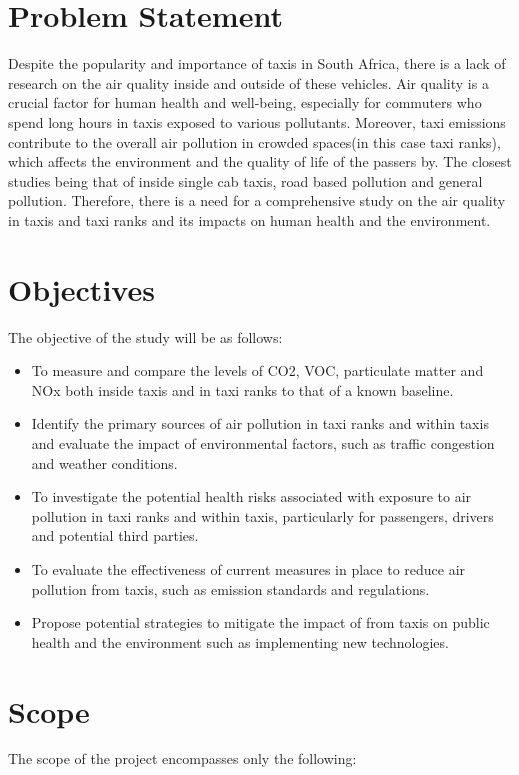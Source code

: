 \section{Problem Statement}
Despite the popularity and importance of taxis in South Africa, there is a lack of research on the air quality inside and outside of these vehicles. 
Air quality is a crucial factor for human health and well-being, especially for commuters who spend long hours in taxis exposed to various pollutants.
Moreover, taxi emissions contribute to the overall air pollution in crowded spaces(in this case taxi ranks), which affects the environment and the quality of life of the passers by. The closest studies being that of inside single cab taxis\cite{insidetaxismall}, road based pollution\cite{taxiNetwork} and general pollution\cite{Environmentalimpact}.
Therefore, there is a need for a comprehensive study on the air quality in taxis and taxi ranks and its impacts on human health and the environment.

\section{Objectives}
The objective of the study will be as follows:
\begin{itemize}
	\item To measure and compare the levels of CO2, VOC, particulate matter and NOx both inside taxis and in taxi ranks to that of a known baseline.
	\item Identify the primary sources of air pollution in taxi ranks and within taxis and evaluate the impact of environmental factors, such as traffic congestion and weather conditions.
	\item To investigate the potential health risks associated with exposure to air pollution in taxi ranks and within taxis, particularly for passengers, drivers and potential third parties.
	\item To evaluate the effectiveness of current measures in place to reduce air pollution from taxis, such as emission standards and regulations.
	\item Propose potential strategies to mitigate the impact of  from taxis on public health and the environment such as implementing new technologies.
\end{itemize}


\section{Scope}
The scope of the project encompasses only the following:

